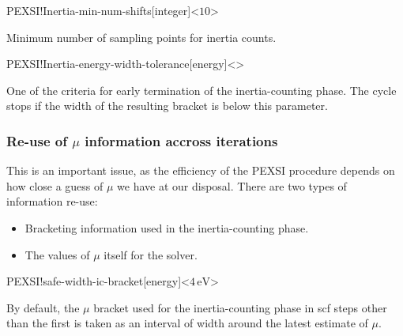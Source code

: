 \begin{fdfentry}{PEXSI!Inertia-min-num-shifts}[integer]<$10$>
  
  Minimum number of sampling points for inertia counts.

\end{fdfentry}

\begin{fdfentry}{PEXSI!Inertia-energy-width-tolerance}[energy]<>

  One of the criteria for early termination of the inertia-counting
  phase.  The cycle stops if the width of the resulting bracket is
  below this parameter.
  
\end{fdfentry}


\subsubsection{Re-use of $\mu$ information accross iterations}

This is an important issue, as the efficiency of the PEXSI procedure
depends on how close a guess of $\mu$ we have at our
disposal. There are two types of information re-use:

\begin{itemize}
  \item%
  Bracketing information used in the inertia-counting phase.
  
  \item%
  The values of $\mu$ itself for the solver.
\end{itemize}

\begin{fdfentry}{PEXSI!safe-width-ic-bracket}[energy]<$4\,\mathrm{eV}$>

  By default, the $\mu$ bracket used for the inertia-counting phase in
  scf steps other than the first is taken as an interval of width
   around the latest estimate of
  $\mu$.
  
\end{fdfentry}


